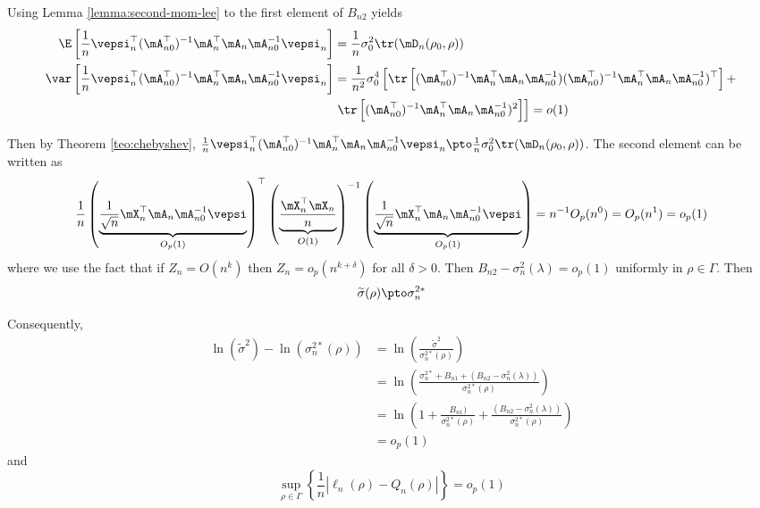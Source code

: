 \documentclass[english,12pt]{book}\usepackage[]{graphicx}\usepackage[]{xcolor}
\begin{document}
\begin{subappendices}
Using Lemma \ref{lemma:second-mom-lee} to the first element of $B_{n2}$ yields
\begin{equation*}
\begin{aligned}
\E\left[\frac{1}{n}\vepsi_n^\top(\mA_{n0}^\top)^{-1}\mA_n^\top\mA_n\mA_{n0}^{-1}\vepsi_n\right] &  = \frac{1}{n}\sigma_0^2\tr(\mD_{n}(\rho_0, \rho)) \\
\var\left[\frac{1}{n}\vepsi_n^\top(\mA_{n0}^\top)^{-1}\mA_n^\top\mA_n\mA_{n0}^{-1}\vepsi_n\right]& = \frac{1}{n^2}\sigma_0^4\left[\tr\left[(\mA_{n0}^\top)^{-1}\mA_n^\top\mA_n\mA_{n0}^{-1})(\mA_{n0}^\top)^{-1}\mA_n^\top\mA_n\mA_{n0}^{-1})^\top\right] +  \right. \\
& \left. \tr\left[(\mA_{n0}^\top)^{-1}\mA_n^\top\mA_n\mA_{n0}^{-1})^2\right]\right] = o(1)
\end{aligned}
\end{equation*}

Then by Theorem \ref{teo:chebyshev}, $\frac{1}{n}\vepsi_n^\top(\mA_{n0}^\top)^{-1}\mA_n^\top\mA_n\mA_{n0}^{-1}\vepsi_n\pto \frac{1}{n}\sigma_0^2\tr(\mD_{n}(\rho_0, \rho))$. The second element can be written as
\begin{equation*}
\frac{1}{n}\left(\underbrace{\frac{1}{\sqrt{n}}\mX_n^\top\mA_n\mA_{n0}^{-1}\vepsi}_{O_p(1)}\right)^\top\left(\underbrace{\frac{\mX_n^\top\mX_n}{n}}_{O(1)}\right)^{-1}\left(\underbrace{\frac{1}{\sqrt{n}}\mX_n^\top\mA_n\mA_{n0}^{-1}\vepsi}_{O_p(1)}\right) = n^{-1}O_p(n^0) = O_p(n^{1})= o_p(1)
\end{equation*}
%
where we use the fact that if $Z_n = O(n^k)$ then $Z_n = o_p(n^{k + \delta})$ for all $\delta>0$. Then $B_{n2}  - \sigma^2_n(\lambda) = o_p(1)$ uniformly in $\rho \in \Gamma$. Then 
\begin{equation*}
\widetilde{\sigma}(\rho)  \pto \sigma^{2*}_n
\end{equation*}

Consequently, 
\begin{equation*}
\begin{aligned}
\ln( \widetilde{\sigma}^{2}) - \ln(\sigma^{2*}_n(\rho)) & = \ln\left(\frac{\widetilde{\sigma}^{2}}{\sigma^{2*}_n(\rho)}\right) \\
& = \ln\left(\frac{\sigma^{2*}_n + B_{n1} + (B_{n2} - \sigma^2_n(\lambda)) }{\sigma^{2*}_n(\rho)}\right) \\
& = \ln\left(1 + \frac{B_{n1}) }{\sigma^{2*}_n(\rho)} + \frac{(B_{n2} - \sigma^2_n(\lambda)) }{\sigma^{2*}_n(\rho)}\right) \\
& = o_p(1)
\end{aligned}
\end{equation*}
%
and
\begin{equation*}
\sup_{\rho\in \Gamma} \left\lbrace \frac{1}{n}\left|  \ell_n(\rho) - Q_n(\rho)\right|\right\rbrace = o_p(1)
\end{equation*}


\end{subappendices}
\end{document}
